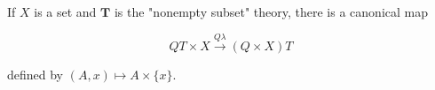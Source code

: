 If $X$ is a set and $\mathbf{T}$ is the "nonempty subset" theory, there is a canonical map

$$QT \times X \xrightarrow{Q\lambda} (Q \times X)T$$

defined by $(A, x) \mapsto A \times \{x\}$.
